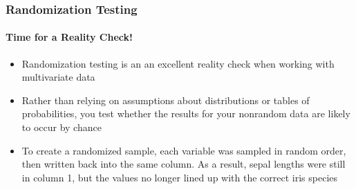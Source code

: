 \documentclass[10pt]{beamer}
\newcommand{\bi}{\begin{itemize}}
\newcommand{\ei}{\end{itemize}}
\begin{document}


\begin{frame}
\frametitle{Randomization Testing}
\framesubtitle{Time for a Reality Check!}

\bi
\item {\color{blue} Randomization testing} is an an excellent reality check
  when working with multivariate data
\vspace{2ex}
\item Rather than relying on assumptions about distributions or tables of
  probabilities, you test whether the results for your {\color{magenta}
  nonrandom} data are likely to occur by chance
\vspace{2ex}
\item To create a randomized sample, each variable was sampled in
  random order, then written back into the same column.  As a result,
  sepal lengths were still in column 1, but the values no longer
  lined up with the correct iris species \ei
\end{frame}
\end{document}
